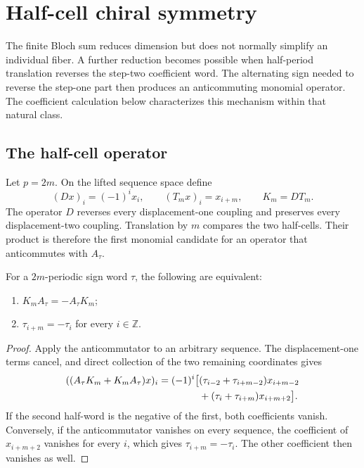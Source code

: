 \section{Half-cell chiral symmetry}
\label{sec:chiral}

The finite Bloch sum reduces dimension but does not normally simplify an
individual fiber.  A further reduction becomes possible when half-period
translation reverses the step-two coefficient word.  The alternating sign
needed to reverse the step-one part then produces an anticommuting monomial
operator.  The coefficient calculation below characterizes this mechanism
within that natural class.

\subsection{The half-cell operator}

Let $p=2m$.  On the lifted sequence space define
\begin{equation}
 (Dx)_i=(-1)^i x_i,\qquad
 (T_mx)_i=x_{i+m},\qquad K_m=DT_m.
 \label{eq:half-cell-operators}
\end{equation}
The operator $D$ reverses every displacement-one coupling and preserves every
displacement-two coupling.  Translation by $m$ compares the two half-cells.
Their product is therefore the first monomial candidate for an operator that
anticommutes with $A_\tau$.

\begin{theorem}
\label{thm:coefficient-chiral}
For a $2m$-periodic sign word $\tau$, the following are equivalent:
\begin{enumerate}
 \item $K_mA_\tau=-A_\tau K_m$;
 \item $\tau_{i+m}=-\tau_i$ for every $i\in\mathbb Z$.
\end{enumerate}
\end{theorem}

\begin{proof}
Apply the anticommutator to an arbitrary sequence.  The displacement-one
terms cancel, and direct collection of the two remaining coordinates gives
\begin{align}
 ((A_\tau K_m+K_mA_\tau)x)_i
 =(-1)^i\bigl[&
   (\tau_{i-2}+\tau_{i+m-2})x_{i+m-2}\notag\\
  &+(\tau_i+\tau_{i+m})x_{i+m+2}\bigr].
 \label{eq:anticommutator-coefficients}
\end{align}
If the second half-word is the negative of the first, both coefficients
vanish.  Conversely, if the anticommutator vanishes on every sequence, the
coefficient of $x_{i+m+2}$ vanishes for every $i$, which gives
$\tau_{i+m}=-\tau_i$.  The other coefficient then vanishes as well.
\end{proof}

